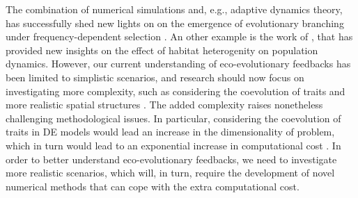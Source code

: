The combination of numerical simulations and, e.g., adaptive dynamics theory, has successfully shed new lights on on the emergence of evolutionary branching under frequency-dependent selection \cite{Dieckmann1999,Doebeli2003}.
%
An other example is the work of \cite{Meszena1997,Debarre2013a, Mirrahimi2020}, that has provided new insights on the effect of habitat heterogenity on population dynamics. 
% 
However, our current understanding of eco-evolutionary feedbacks has been limited to simplistic scenarios, and research should now focus on investigating more complexity, such as considering the coevolution of traits \cite{Debarre2014,Falster2017,Doebeli2011} and more realistic spatial structures \cite{XXX}.
% 
% 
The added complexity raises nonetheless challenging methodological issues. In particular, considering the coevolution of traits in DE models would lead an increase in the dimensionality of problem, which in turn would lead to an exponential increase in computational cost \cite{XXX}.
% 
In order to better understand eco-evolutionary feedbacks, we need to investigate more realistic scenarios, which will, in turn, require the development of novel numerical methods that can cope with the extra computational cost.
% 

